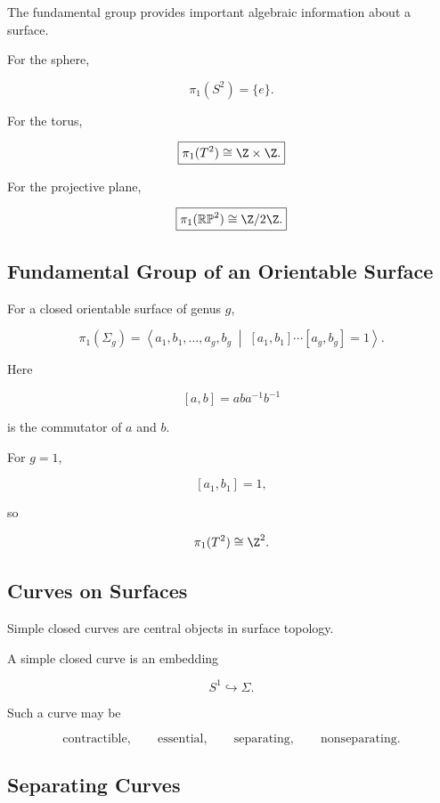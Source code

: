 The fundamental group provides important algebraic information about a
surface.

For the sphere,

\[
\boxed{
\pi_1(S^2)=\{e\}.
}
\]

For the torus,

\[
\boxed{
\pi_1(T^2)
\cong
\Z\times\Z.
}
\]

For the projective plane,

\[
\boxed{
\pi_1(\mathbb{RP}^2)
\cong
\Z/2\Z.
}
\]

\subsection{Fundamental Group of an Orientable Surface}
\label{subsec:fundamental-group-orientable-surface}

For a closed orientable surface of genus \(g\),

\[
\boxed{
\pi_1(\Sigma_g)
=
\left\langle
a_1,b_1,\ldots,a_g,b_g
\;\middle|\;
[a_1,b_1]\cdots[a_g,b_g]=1
\right\rangle.
}
\]

Here

\[
[a,b]
=
aba^{-1}b^{-1}
\]

is the commutator of \(a\) and \(b\).

For \(g=1\),

\[
[a_1,b_1]=1,
\]

so

\[
\pi_1(T^2)
\cong
\Z^2.
\]

\subsection{Curves on Surfaces}
\label{subsec:curves-on-surfaces}

Simple closed curves are central objects in surface topology.

A simple closed curve is an embedding

\[
\boxed{
S^1\hookrightarrow\Sigma.
}
\]

Such a curve may be

\[
\boxed{
\text{contractible},
\qquad
\text{essential},
\qquad
\text{separating},
\qquad
\text{nonseparating}.
}
\]

\subsection{Separating Curves}
\label{subsec:separating-curves}

